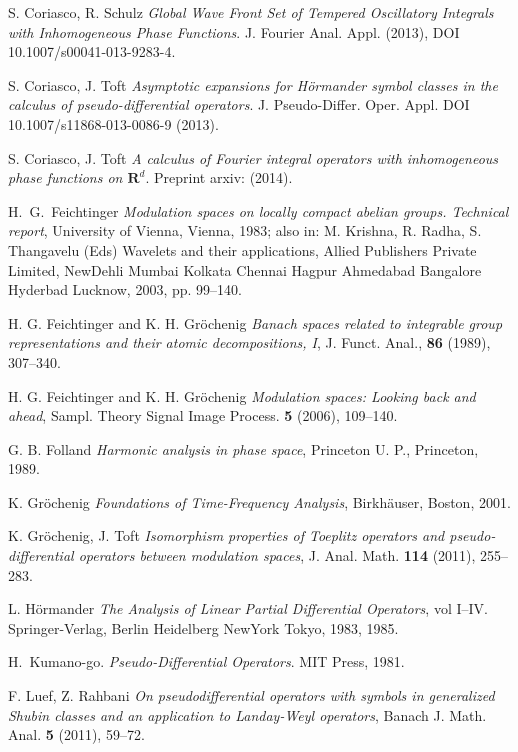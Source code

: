 \documentclass[12pt,a4paper,reqno]{amsart}
\numberwithin{equation}{section}
\numberwithin{thm}{section}
\theoremstyle{definition}
\theoremstyle{remark}
\begin{document}
\begin{thebibliography}{150}
 S. Coriasco, R. Schulz \emph{Global Wave Front Set of
Tempered Oscillatory Integrals with Inhomogeneous Phase Functions}.
J. Fourier Anal. Appl.
(2013), DOI 10.1007/s00041-013-9283-4.

 S. Coriasco, J. Toft \emph{Asymptotic expansions
for H{\"o}rmander symbol classes in the calculus of pseudo-differential
operators}. J. Pseudo-Differ. Oper. Appl. 
DOI 10.1007/s11868-013-0086-9 (2013).

 S. Coriasco, J. Toft \emph{A calculus of Fourier integral operators
with inhomogeneous phase functions on ${\mathbf R^{{d}}}$}. Preprint arxiv: (2014).

  H.~G.~Feichtinger \emph{Modulation spaces on locally
compact abelian groups. Technical report}, {University of
Vienna}, Vienna, 1983; also in: M. Krishna, R. Radha,
S. Thangavelu (Eds) Wavelets and their applications, Allied
Publishers Private Limited, NewDehli Mumbai Kolkata Chennai Hagpur
Ahmedabad Bangalore Hyderbad Lucknow, 2003, pp. 99--140.

  {H. G. Feichtinger and K. H. Gr{\"o}chenig}
\emph{Banach spaces related to integrable group representations and
their atomic decompositions, I}, J. Funct. Anal., \textbf{86}
(1989), 307--340.

 {H. G. Feichtinger and K. H. Gr{\"o}chenig}
\emph{Modulation spaces: Looking back and ahead},
Sampl. Theory Signal Image Process. \textbf{5} (2006), 109--140.

  {G. B. Folland} \emph
{Harmonic analysis in phase space}, {Princeton U. P., Princeton},
1989.

 K. Gr\"{o}chenig \newblock \emph{Foundations of
Time-Frequency Analysis},
\newblock Birkh\"auser, Boston, 2001.

 K. Gr{\"o}chenig, J. Toft \emph{Isomorphism properties of
Toeplitz operators and pseudo-differential operators between modulation
spaces}, J. Anal. Math. \textbf{114} (2011), 255--283.

 L. H\"ormander \emph{The Analysis of Linear
Partial Differential Operators}, vol {I--IV}.
Springer-Verlag, Berlin Heidelberg NewYork Tokyo, 1983, 1985.

 H.~Kumano-go.
\emph{Pseudo-Differential Operators}.
\newblock MIT Press, 1981.

 F. Luef, Z. Rahbani \emph{On pseudodifferential operators with
symbols in generalized Shubin classes and an application to Landay-Weyl operators},
Banach J. Math. Anal. \textbf{5} (2011), 59--72.


\end{thebibliography}
\end{document}
